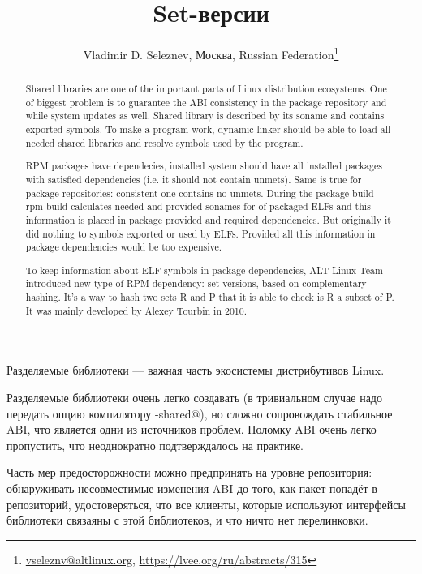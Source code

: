 \documentclass[10pt, a5paper]{article}
\begin{document}
\title{Set-версии}
\author{Vladimir D. Seleznev, Москва, Russian Federation\footnote{\url{vseleznv@altlinux.org}, \url {https://lvee.org/ru/abstracts/315}}}
\maketitle
\begin{abstract}
Shared libraries are one of the important parts of Linux \linebreak distribution ecosystems. One of biggest problem is to guarantee the ABI consistency in the package repository and while system updates as well. Shared library is described by its soname and contains exported symbols. To make a program work, dynamic linker should be able to load all needed shared libraries and resolve symbols used by the program.

RPM packages have dependecies, installed system should have all installed packages with satisfied dependencies (i.e. it should not contain unmets). Same is true for package repositories: \linebreak consistent one contains no unmets. During the package build rpm-build calculates needed and provided sonames for of \linebreak packaged ELFs and this information is placed in package provided and required dependencies. But originally it did nothing to \linebreak symbols exported or used by ELFs. Provided all this information in package dependencies would be too expensive.

To keep information about ELF symbols in package \linebreak dependencies, ALT Linux Team introduced new type of RPM dependency: set-versions, based on complementary hashing. It's a way to hash two sets R and P that it is able to check is R a subset of P. It was mainly developed by Alexey Tourbin in 2010.
\end{abstract}
Разделяемые библиотеки --- важная часть экосистемы дистрибутивов Linux.

Разделяемые библиотеки очень легко создавать (в тривиальном случае надо передать опцию компилятору \verb@-shared@), но сложно сопровождать стабильное ABI, что является одни из источников проблем. Поломку ABI очень легко пропустить, что неоднократно подтверждалось на практике.

Часть мер предосторожности можно предпринять на уровне репозитория: обнаруживать несовместимые изменения ABI до того, как пакет попадёт в репозиторий, удостоверяться, что все клиенты, которые используют интерфейсы библиотеки связаяны с этой библиотеков, и что ничто нет перелинковки.
\end{document}
